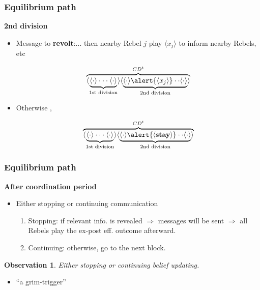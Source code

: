 \documentclass[10pt]{beamer}
\newtheorem*{observation}{Observation}
\begin{document}
\begin{frame}
\frametitle{Equilibrium path}

\textbf{2nd division}

\begin{itemize}
\item \alert{Message to \textbf{revolt}}:... then nearby Rebel $j$ \alert{play $\langle x_j \rangle$} to inform nearby Rebels, etc

\[\overbrace{\langle\underbrace{\langle \cdot \rangle \cdot \cdot \cdot \langle \cdot \rangle}_{\text{1st division}}\rangle \langle\underbrace{{\langle \cdot \rangle} \alert{\langle x_j \rangle} \cdot \cdot \langle \cdot \rangle}_{\text{2nd division}} \rangle }^{CD^t}\] 

\item \alert{Otherwise} ,

\[\overbrace{\langle\underbrace{\langle \cdot \rangle \cdot \cdot \cdot \langle \cdot \rangle}_{\text{1st division}}\rangle \langle\underbrace{{\langle \cdot \rangle} \alert{\langle \textbf{stay} \rangle} \cdot \cdot \langle \cdot \rangle}_{\text{2nd division}} \rangle }^{CD^t}\] 

\end{itemize}

\end{frame}


\begin{frame}
\frametitle{Equilibrium path}

\textbf{After coordination period}

\begin{itemize}
\item Either \alert{stopping} or \alert{continuing} communication
\begin{enumerate}
\item {Stopping}: if relevant info. is revealed $\Rightarrow$ messages will be sent $\Rightarrow$ \alert{all} Rebels play the ex-post eff. outcome afterward. 
\item {Continuing}: otherwise, go to the next block.
\end{enumerate}

\end{itemize}

\begin{observation}
Either \alert{stopping} or \alert{continuing} belief updating.
\end{observation}

\begin{itemize}
\item ``a {grim-trigger}'' 

\end{itemize}

\end{frame}
\end{document}
